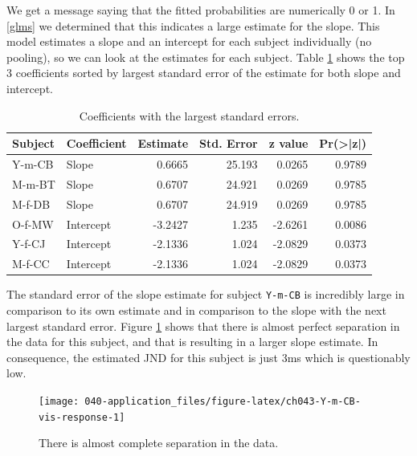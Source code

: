 \documentclass[11pt, oneside, openany]{scrbook}
\begin{document}

We get a message saying that the fitted probabilities are numerically 0 or 1. In \ref{glms} we determined that this indicates a large estimate for the slope. This model estimates a slope and an intercept for each subject individually (no pooling), so we can look at the estimates for each subject. Table \ref{tab:ch043-Intensive-Oyster} shows the top 3 coefficients sorted by largest standard error of the estimate for both slope and intercept.

\begin{table}[!h]

\caption{\label{tab:ch043-Intensive-Oyster}Coefficients with the largest standard errors.}
\centering
\begin{tabular}[t]{llrrrr}
\toprule
Subject & Coefficient & Estimate & Std. Error & z value & Pr(>|z|)\\
\midrule
Y-m-CB & Slope & 0.6665 & 25.193 & 0.0265 & 0.9789\\
M-m-BT & Slope & 0.6707 & 24.921 & 0.0269 & 0.9785\\
M-f-DB & Slope & 0.6707 & 24.919 & 0.0269 & 0.9785\\
O-f-MW & Intercept & -3.2427 & 1.235 & -2.6261 & 0.0086\\
Y-f-CJ & Intercept & -2.1336 & 1.024 & -2.0829 & 0.0373\\
\addlinespace
M-f-CC & Intercept & -2.1336 & 1.024 & -2.0829 & 0.0373\\
\bottomrule
\end{tabular}
\end{table}

The standard error of the slope estimate for subject \texttt{Y-m-CB} is incredibly large in comparison to its own estimate and in comparison to the slope with the next largest standard error. Figure \ref{fig:ch043-Y-m-CB-vis-response} shows that there is almost perfect separation in the data for this subject, and that is resulting in a larger slope estimate. In consequence, the estimated JND for this subject is just 3ms which is questionably low.

\begin{figure}

{\centering \texttt{[image: 040-application\_files/figure-latex/ch043-Y-m-CB-vis-response-1]} 

}

\caption{There is almost complete separation in the data.}\label{fig:ch043-Y-m-CB-vis-response}
\end{figure}
\end{document}
